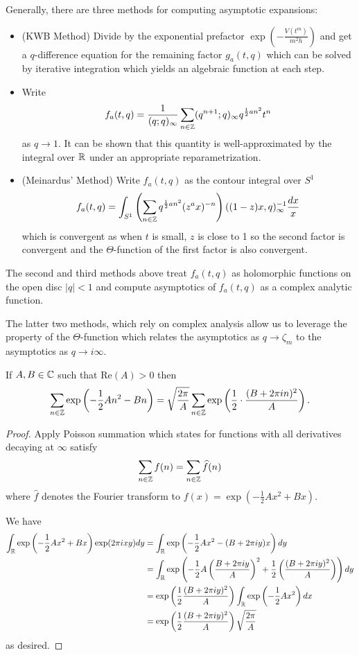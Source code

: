 Generally, there are three methods for computing asymptotic expansions:
\begin{itemize}
    \item (KWB Method) Divide by the exponential prefactor $\exp\left(-\frac{V(t^{m})}{m^{2}h}\right)$ and get a $q$-difference equation for the remaining factor $g_{a}(t,q)$ which can be solved by iterative integration which yields an algebraic function at each step. 
    \item Write 
    $$f_{a}(t,q)=\frac{1}{(q;q)_{\infty}}\sum_{n\in\mathbb{Z}}(q^{n+1};q)_{\infty}q^{\frac{1}{2}an^{2}}t^{n}$$
    as $q\to 1$. It can be shown that this quantity is well-approximated by the integral over $\mathbb{R}$ under an appropriate reparametrization. 
    \item (Meinardus' Method) Write $f_{a}(t,q)$ as the contour integral over $S^{1}$
    $$f_{a}(t,q)=\int_{S^{1}}\left(\sum_{n\in\mathbb{Z}}q^{\frac{1}{2}an^{2}}(z^{a}x)^{-n}\right)((1-z)x,q)^{-1}_{\infty}\frac{dx}{x}$$
    which is convergent as when $t$ is small, $z$ is close to 1 so the second factor is convergent and the $\Theta$-function of the first factor is also convergent. 
\end{itemize} 
\begin{remark}
    The second and third methods above treat $f_{a}(t,q)$ as holomorphic functions on the open disc $|q|<1$ and compute asymptotics of $f_{a}(t,q)$ as a complex analytic function. 
\end{remark}
The latter two methods, which rely on complex analysis allow us to leverage the property of the $\Theta$-function which relates the asymptotics as $q\to\zeta_{m}$ to the asymptotics as $q\to i\infty$. 
\begin{proposition}\label{prop: modularity of Theta function}
    If $A,B\in\mathbb{C}$ such that $\mathrm{Re}(A)>0$ then 
    $$\sum_{n\in\mathbb{Z}}\exp\left(-\frac{1}{2}An^{2}-Bn\right)=\sqrt{\frac{2\pi}{A}}\sum_{n\in\mathbb{Z}}\exp\left(\frac{1}{2}\cdot\frac{(B+2\pi i n)^{2}}{A}\right).$$
\end{proposition}
\begin{proof}
    Apply Poisson summation which states for functions with all derivatives decaying at $\infty$ satisfy
    $$\sum_{n\in\mathbb{Z}}f(n)=\sum_{n\in\mathbb{Z}}\widehat{f}(n)$$
    where $\widehat{f}$ denotes the Fourier transform to $f(x)=\exp\left(-\frac{1}{2}Ax^{2}+Bx\right)$. 

    We have 
    \footnotesize
    \begin{align*}
        \int_{\mathbb{R}}\exp\left(-\frac{1}{2}Ax^{2}+Bx\right)\exp(2\pi i xy)dy &= \int_{\mathbb{R}}\exp\left(-\frac{1}{2}Ax^{2}-(B+2\pi i y)x\right)dy \\
        &= \int_{\mathbb{R}}\exp\left(-\frac{1}{2}A\left(\frac{B+2\pi i y}{A}\right)^{2}+\frac{1}{2}\left(\frac{(B+2\pi i y)^{2}}{A}\right)\right)dy \\
        &= \exp\left(\frac{1}{2}\frac{(B+2\pi i y)^{2}}{A}\right)\int_{\mathbb{R}}\exp\left(-\frac{1}{2}Ax^{2}\right)dx \\
        &= \exp\left(\frac{1}{2}\frac{(B+2\pi i y)^{2}}{A}\right)\sqrt{\frac{2\pi}{A}}
    \end{align*}
    \normalsize
    as desired. 
\end{proof}
